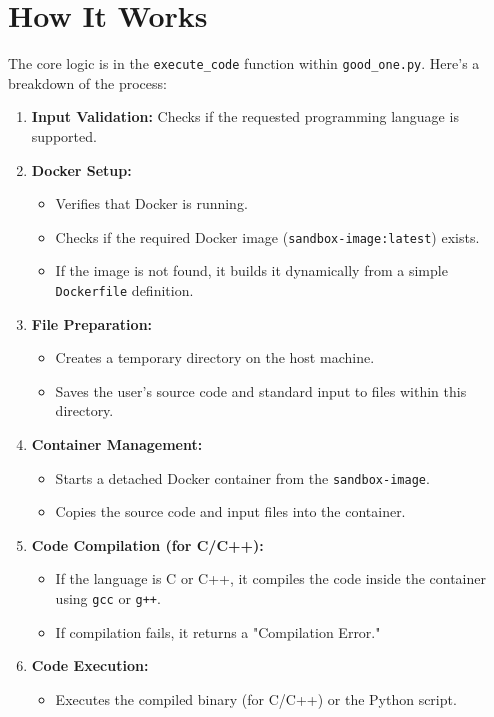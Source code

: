 \documentclass{article}
\begin{document}
\section{How It Works}
The core logic is in the \texttt{execute\_code} function within \texttt{good\_one.py}. Here's a breakdown of the process:
\begin{enumerate}
    \item \textbf{Input Validation:} Checks if the requested programming language is supported.
    \item \textbf{Docker Setup:}
    \begin{itemize}
        \item Verifies that Docker is running.
        \item Checks if the required Docker image (\texttt{sandbox-image:latest}) exists.
        \item If the image is not found, it builds it dynamically from a simple \texttt{Dockerfile} definition.
    \end{itemize}
    \item \textbf{File Preparation:}
    \begin{itemize}
        \item Creates a temporary directory on the host machine.
        \item Saves the user's source code and standard input to files within this directory.
    \end{itemize}
    \item \textbf{Container Management:}
    \begin{itemize}
        \item Starts a detached Docker container from the \texttt{sandbox-image}.
        \item Copies the source code and input files into the container.
    \end{itemize}
    \item \textbf{Code Compilation (for C/C++):}
    \begin{itemize}
        \item If the language is C or C++, it compiles the code inside the container using \texttt{gcc} or \texttt{g++}.
        \item If compilation fails, it returns a "Compilation Error."
    \end{itemize}
    \item \textbf{Code Execution:}
    \begin{itemize}
        \item Executes the compiled binary (for C/C++) or the Python script.

\end{itemize}
\end{enumerate}
\end{document}
